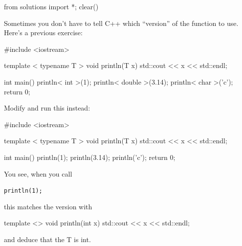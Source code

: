 \begin{python0}
from solutions import *; clear()
\end{python0}

Sometimes you don't have to tell C++ which ``version''
of the function to use. Here's a previous exercise:

\begin{consolethree}[escapeinside=||]
#include <iostream>

template < typename T >
void println(T x)
{
    std::cout << x << std::endl;
}

int main()
{
    println< int >(1);
    println< double >(3.14);
    println< char >('c');
    return 0;
}
\end{consolethree}

Modify and run this instead:

\begin{consolethree}[escapeinside=||]
#include <iostream>

template < typename T >
void println(T x)
{
    std::cout << x << std::endl;
}

int main()
{
    println(1);
    println(3.14);
    println('c');
    return 0;
}
\end{consolethree}

You see, when you call

\verb!println(1);!

this matches the version with

\begin{consolethree}[escapeinside=||]
template <>
void println(int x)
{
    std::cout << x << std::endl;
}
\end{consolethree}

and deduce that the T is int.



